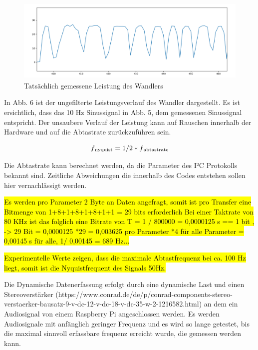 \begin{flushleft}
\begin{figure}
    \centering
    \includegraphics[height= 4cm, width = 12cm]{Pictures/TatsDaten.png}
    \caption{Tatsächlich gemessene Leistung des Wandlers}
\end{figure}

In Abb. 6 ist der ungefilterte Leistungsverlauf des Wandler dargestellt. Es ist ersichtlich, dass das 10 Hz Sinussignal in Abb. 5, dem gemessenen Sinussignal entspricht. Der unsaubere Verlauf der Leistung kann auf Rauschen innerhalb der Hardware und auf die Abtastrate zurückzuführen sein. 



\begin{equation}
\label{Sigmoid}
f\textsubscript{nyquist} = 1/2 * f\textsubscript{abtastrate}
\end{equation}

Die Abtastrate kann berechnet werden, da die Parameter des I²C Protokolls bekannt sind. Zeitliche Abweichungen die innerhalb des Codes entstehen sollen hier vernachlässigt werden. 

\hl{Es werden pro Parameter 2 Byte an Daten angefragt, somit ist pro Transfer eine Bitmenge von 1+8+1+8+1+8+1+1 = 29 bits erforderlich Bei einer Taktrate von 80 KHz ist das folglich eine Bitrate von T = 1 / 800000 = 0,0000125 s == 1 bit , -> 29 Bit = 0,0000125 *29 = 0,003625 pro Parameter *4 für alle Parameter = 0,00145 s für alle, 1/ 0,00145 = 689 Hz...} 

\hl{Experimentelle Werte zeigen, dass die maximale Abtastfrequenz bei ca. 100 Hz liegt, somit ist die Nyquistfrequent des Signals 50Hz.}

\end{flushleft}


Die Dynamische Datenerfassung erfolgt durch eine dynamische Last und einen Stereoverstärker (https://www.conrad.de/de/p/conrad-components-stereo-verstaerker-bausatz-9-v-dc-12-v-dc-18-v-dc-35-w-2-1216582.html) an dem ein Audiosignal von einem Raspberry Pi angeschlossen werden. Es werden Audiosignale mit anfänglich geringer Frequenz und es wird so lange getestet, bis die maximal sinnvoll erfassbare frequenz erreicht wurde, die gemessen werden kann. 


